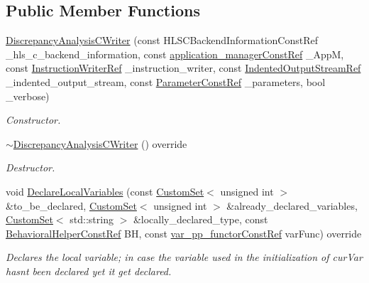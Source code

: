 \subsection*{Public Member Functions}
\begin{DoxyCompactItemize}
\item 
\hyperlink{classDiscrepancyAnalysisCWriter_a19aa97789a4f8c8b4c52a4408d9bb3cc}{Discrepancy\+Analysis\+C\+Writer} (const H\+L\+S\+C\+Backend\+Information\+Const\+Ref \+\_\+hls\+\_\+c\+\_\+backend\+\_\+information, const \hyperlink{application__manager_8hpp_abb985163a2a3fb747f6f03b1eaadbb44}{application\+\_\+manager\+Const\+Ref} \+\_\+\+AppM, const \hyperlink{instruction__writer_8hpp_a40ea26c38a2909ba48f88f997144b260}{Instruction\+Writer\+Ref} \+\_\+instruction\+\_\+writer, const \hyperlink{indented__output__stream_8hpp_ab32278e11151ef292759c88e99b77feb}{Indented\+Output\+Stream\+Ref} \+\_\+indented\+\_\+output\+\_\+stream, const \hyperlink{Parameter_8hpp_a37841774a6fcb479b597fdf8955eb4ea}{Parameter\+Const\+Ref} \+\_\+parameters, bool \+\_\+verbose)
\begin{DoxyCompactList}\small\item\em Constructor. \end{DoxyCompactList}\item 
\hyperlink{classDiscrepancyAnalysisCWriter_a17169eb934b2eb19f7d80fd07e260ec7}{$\sim$\+Discrepancy\+Analysis\+C\+Writer} () override
\begin{DoxyCompactList}\small\item\em Destructor. \end{DoxyCompactList}\item 
void \hyperlink{classDiscrepancyAnalysisCWriter_af877ad0ea844b3dd8da2c8e9a2756986}{Declare\+Local\+Variables} (const \hyperlink{custom__set_8hpp_a615bc2f42fc38a4bb1790d12c759e86f}{Custom\+Set}$<$ unsigned int $>$ \&to\+\_\+be\+\_\+declared, \hyperlink{custom__set_8hpp_a615bc2f42fc38a4bb1790d12c759e86f}{Custom\+Set}$<$ unsigned int $>$ \&already\+\_\+declared\+\_\+variables, \hyperlink{custom__set_8hpp_a615bc2f42fc38a4bb1790d12c759e86f}{Custom\+Set}$<$ std\+::string $>$ \&locally\+\_\+declared\+\_\+type, const \hyperlink{behavioral__helper_8hpp_aae973b54cac87eef3b27442aa3e1e425}{Behavioral\+Helper\+Const\+Ref} BH, const \hyperlink{var__pp__functor_8hpp_a8a6b51b6519401d911398943510557f0}{var\+\_\+pp\+\_\+functor\+Const\+Ref} var\+Func) override
\begin{DoxyCompactList}\small\item\em Declares the local variable; in case the variable used in the initialization of cur\+Var hasn\textquotesingle{}t been declared yet it get declared. \end{DoxyCompactList}\item 

\end{DoxyCompactItemize}
